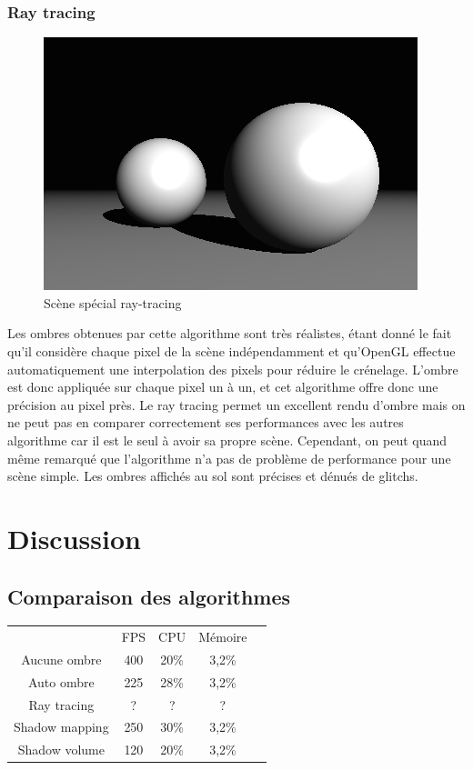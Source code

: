 \documentclass[a4paper,12pt]{report}
\begin{document}

\subsection{Ray tracing}

\begin{figure}[H]
\includegraphics[scale=0.4]{images/raytracing.png}
\centering
\caption{Scène spécial ray-tracing}
\end{figure}

Les ombres obtenues par cette algorithme sont très réalistes, étant donné le fait qu'il considère chaque pixel de la scène indépendamment et qu'OpenGL effectue automatiquement une interpolation des pixels pour réduire le crénelage. L'ombre est donc appliquée sur chaque pixel un à un, et cet algorithme offre donc une précision au pixel près. Le ray tracing permet un excellent rendu d'ombre mais on ne peut pas en comparer correctement ses performances avec les autres algorithme car il est le seul à avoir sa propre scène. Cependant, on peut quand m\^eme remarqué que l'algorithme n'a pas de problème de performance pour une scène simple. Les ombres affichés au sol sont précises et dénués de glitchs.


\chapter{Discussion}

\section{Comparaison des algorithmes}
\begin{table}[h]
\centering
\begin{tabular}{|c|c|c|c|l}
\cline{1-4}
 & FPS  & CPU & Mémoire  &  \\ \cline{1-4}
 Aucune ombre& 400 & 20\%  & 3,2\%  &  \\ \cline{1-4}
 Auto ombre& 225 & 28\%  & 3,2\%  &  \\ \cline{1-4}
 Ray tracing& ? & ?  & ?  &  \\ \cline{1-4}
 Shadow mapping& 250  & 30\%  & 3,2\%  &  \\ \cline{1-4}
 Shadow volume& 120  & 20\%  & 3,2\%  &  \\ \cline{1-4}
\end{tabular}
\end{table}
\end{document}
